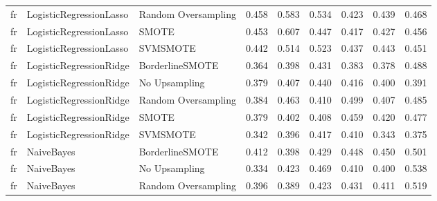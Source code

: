 \begin{tabular}{lllllllll}
      fr &      LogisticRegressionLasso & Random Oversampling & 0.458 &                     0.583 &                 0.534 &                  0.423 &                                   0.439 &     0.468 \\
      fr &      LogisticRegressionLasso &               SMOTE & 0.453 &                     0.607 &                 0.447 &                  0.417 &                                   0.427 &     0.456 \\
      fr &      LogisticRegressionLasso &            SVMSMOTE & 0.442 &                     0.514 &                 0.523 &                  0.437 &                                   0.443 &     0.451 \\
      fr &      LogisticRegressionRidge &     BorderlineSMOTE & 0.364 &                     0.398 &                 0.431 &                  0.383 &                                   0.378 &     0.488 \\
      fr &      LogisticRegressionRidge &       No Upsampling & 0.379 &                     0.407 &                 0.440 &                  0.416 &                                   0.400 &     0.391 \\
      fr &      LogisticRegressionRidge & Random Oversampling & 0.384 &                     0.463 &                 0.410 &                  0.499 &                                   0.407 &     0.485 \\
      fr &      LogisticRegressionRidge &               SMOTE & 0.379 &                     0.402 &                 0.408 &                  0.459 &                                   0.420 &     0.477 \\
      fr &      LogisticRegressionRidge &            SVMSMOTE & 0.342 &                     0.396 &                 0.417 &                  0.410 &                                   0.343 &     0.375 \\
      fr &                   NaiveBayes &     BorderlineSMOTE & 0.412 &                     0.398 &                 0.429 &                  0.448 &                                   0.450 &     0.501 \\
      fr &                   NaiveBayes &       No Upsampling & 0.334 &                     0.423 &                 0.469 &                  0.410 &                                   0.400 &     0.538 \\
      fr &                   NaiveBayes & Random Oversampling & 0.396 &                     0.389 &                 0.423 &                  0.431 &                                   0.411 &     0.519 \\

\end{tabular}

